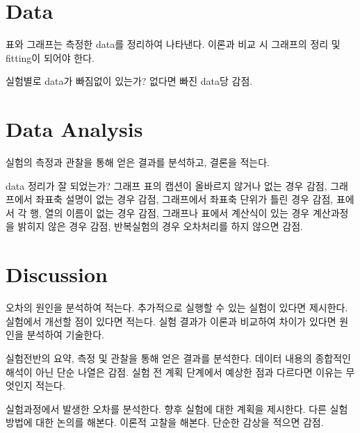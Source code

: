 \documentclass[10pt,aps,twocolumn]{revtex4-2}
\begin{document}
\section{Data}

표와 그래프는 측정한 data를 정리하여 나타낸다. 이론과 비교 시 그래프의 정리 및 fitting이 되어야 한다.

실험별로 data가 빠짐없이 있는가? 없다면 빠진 data당 감점. 


\section{Data Analysis}
실험의 측정과 관찰을 통해 얻은 결과를 분석하고, 결론을 적는다.

data 정리가 잘 되었는가? 그래프 표의 캡션이 올바르지 않거나 없는 경우 감점, 그래프에서 좌표축 설명이 없는 경우 감점, 그래프에서 좌표축 단위가 틀린 경우 감점, 표에서 각 행, 열의 이름이 없는 경우 감점, 그래프나 표에서 계산식이 있는 경우 계산과정을 밝히지 않은 경우 감점, 반복실험의 경우 오차처리를 하지 않으면 감점.


\section{Discussion}

오차의 원인을 분석하여 적는다. 추가적으로 실행할 수 있는 실험이 있다면 제시한다. 실험에서 개선할 점이 있다면 적는다. 실험 결과가 이론과 비교하여 차이가 있다면 원인을 분석하여 기술한다.

실험전반의 요약, 측정 및 관찰을 통해 얻은 결과를 분석한다. 데이터 내용의 종합적인 해석이 아닌 단순 나열은 감점. 실험 전 계획 단계에서 예상한 점과 다르다면 이유는 무엇인지 적는다.

실험과정에서 발생한 오차를 분석한다. 향후 실험에 대한 계획을 제시한다. 다른 실험 방법에 대한 논의를 해본다. 이론적 고찰을 해본다. 단순한 감상을 적으면 감점.

\onecolumngrid





\nocite{*}
\end{document}
